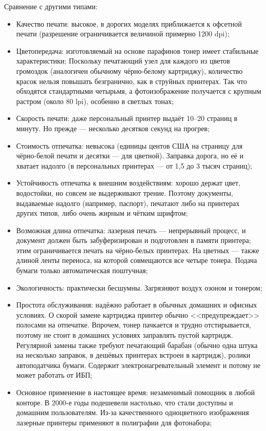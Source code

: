 \begin{itemize}
 Сравнение с другими типами:
 \begin{itemize}
  \item Качество печати: высокое, в дорогих моделях приближается к офсетной печати (разрешение ограничивается величиной примерно 1200 dpi);
  \item Цветопередача: изготовляемый на основе парафинов тонер имеет стабильные характеристики; Поскольку печатающий узел для каждого из цветов громоздок (аналогичен обычному чёрно-белому картриджу), количество красок нельзя повышать безгранично, как в струйных принтерах. Так что обходятся стандартными четырьмя, а фотоизображение получается с крупным растром (около 80 lpi), особенно в светлых тонах;
  \item Скорость печати: даже персональный принтер выдаёт 10--20 страниц в минуту. Но прежде --- несколько десятков секунд на прогрев;
  \item Стоимость отпечатка: невысока (единицы центов США на страницу для чёрно-белой печати и десятки --- для цветной). Заправка дорога, но её и хватает надолго (в персональных принтерах --- от 1,5 до 3 тысяч страниц);
  \item Устойчивость отпечатка к внешним воздействиям: хорошо держат цвет, водостойки, но совсем не выдерживают трение. Поэтому документы, выдаваемые надолго (например, паспорт), печатают либо на принтерах других типов, либо очень жирным и чётким шрифтом;
  \item Возможная длина отпечатка: лазерная печать --- непрерывный процесс, и документ должен быть забуферизирован и подготовлен в памяти принтера; этим ограничивается печать на чёрно-белых принтерах. На цветных --- также длиной ленты переноса, на которой совмещаются все четыре тонера. Подача бумаги только автоматическая поштучная;
  \item Экологичность: практически бесшумны. Загрязняют воздух озоном и тонером;
  \item Простота обслуживания: надёжно работает в обычных домашних и офисных условиях. О скорой замене картриджа принтер обычно <<предупреждает>> полосами на отпечатке. Впрочем, тонер пачкается и трудно отстирывается, поэтому не стоит в домашних условиях заправлять пустой картридж. Регулярной замены также требуют печатающий барабан (обычно одна штука на несколько заправок, в дешёвых принтерах встроен в картридж), ролики автоподатчика бумаги. Содержит электронагревательный элемент и потому не может работать от ИБП;
  \item Основное применение в настоящее время: незаменимый помощник в любой конторе. В 2000-е годы подешевели настолько, что стали доступны и домашним пользователям. Из-за качественного одноцветного изображения лазерные принтеры применяют в полиграфии для фотонабора; 
 \end{itemize}
\end{itemize}

